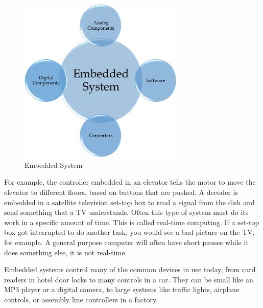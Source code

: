 \documentclass[twoside,a4paper,16pt]{book}
\begin{document}
{ \begin{figure}[ht!]
 	\begin{center}
 		\includegraphics[width=8.0cm]{6.png}
 		\caption{Embedded System}
 	\end{center}
 \end{figure}
For example, the controller embedded in an elevator tells the motor to move the elevator to different floors, based on buttons that are pushed. A decoder is embedded in a satellite television set-top box to read a signal from the dish and send something that a TV understands. Often this type of system must do its work in a specific amount of time. This is called real-time computing. If a set-top box got interrupted to do another task, you would see a bad picture on the TV, for example. A general purpose computer will often have short pauses while it does something else, it is not real-time.

Embedded systems control many of the common devices in use today, from card readers in hotel door locks to many controls in a car. They can be small like an MP3 player or a digital camera, to large systems like traffic lights, airplane controls, or assembly line controllers in a factory.
}
\end{document}
